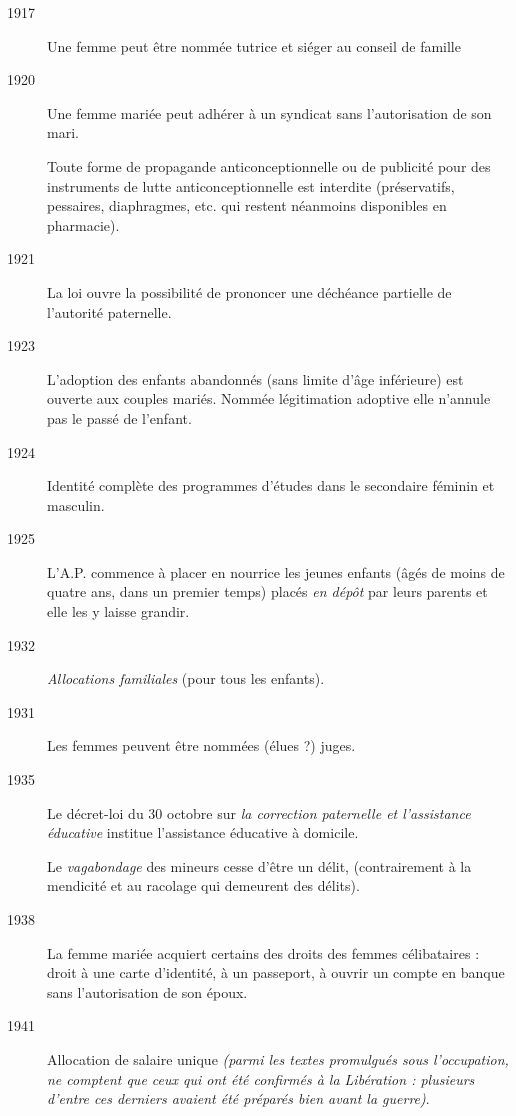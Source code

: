 \begin{description}
\item[1917] Une femme peut être nommée tutrice et siéger au conseil de famille

\item[1920] Une femme mariée peut adhérer à un syndicat sans l'autorisation de son mari.

Toute forme de propagande anticonceptionnelle ou de publicité pour des instruments de lutte anticonceptionnelle est interdite (préservatifs, pessaires, diaphragmes, etc. qui restent néanmoins disponibles en pharmacie).

\item[1921] La loi ouvre la possibilité de prononcer une déchéance partielle de l'autorité paternelle. 

\item[1923] L'adoption des enfants abandonnés (sans limite d'âge inférieure) est ouverte aux couples mariés. Nommée légitimation adoptive elle n'annule pas le passé de l'enfant.

\item[1924] Identité complète des programmes d'études dans le secondaire féminin et masculin.

\item[1925] L'A.P. commence à placer en nourrice les jeunes enfants (âgés de moins de quatre ans, dans un premier temps) placés \emph{en dépôt} par leurs parents et elle les y laisse grandir. 

\item[1932] \emph{Allocations familiales} (pour tous les enfants).

\item[1931] Les femmes peuvent être nommées (élues ?) juges.

\item[1935] Le décret-loi du 30 octobre sur {\emph{la correction paternelle et l'assistance éducative}} institue l'assistance éducative à domicile. 

Le \emph{vagabondage} des mineurs cesse d'être un délit, (contrairement à la mendicité et au racolage qui demeurent des délits). 

\item[1938] La femme mariée acquiert certains des droits des femmes célibataires : droit à une carte d'identité, à un passeport, à ouvrir un compte en banque sans l'autorisation de son époux.

\item[1941] Allocation de salaire unique \emph{(parmi les textes promulgués sous l'occupation, ne comptent que ceux qui ont été confirmés à la Libération : plusieurs d'entre ces derniers avaient été préparés bien avant la guerre)}. 


\end{description}
